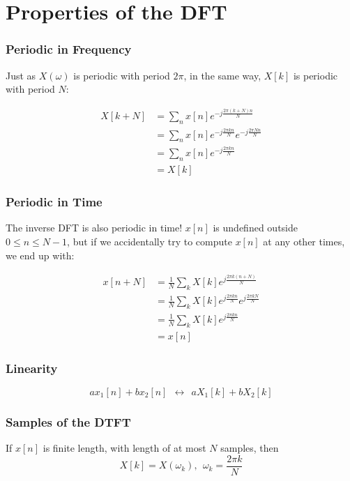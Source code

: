 \documentclass{beamer}
\begin{document}
\section[Properties of DFT]{Properties of the DFT}
\setcounter{subsection}{1}


\begin{frame}
  \frametitle{Periodic in Frequency}

  Just as $X(\omega)$ is periodic with period $2\pi$, in the same way,
  $X[k]$ is periodic with period $N$:

  \begin{align*}
    X[k+N] &= \sum_n x[n]e^{-j\frac{2\pi (k+N)n}{N}}\\
    &= \sum_n x[n]e^{-j\frac{2\pi kn}{N}}e^{-j\frac{2\pi Nn}{N}}\\    
    &= \sum_n x[n]e^{-j\frac{2\pi kn}{N}}\\
    &= X[k]
  \end{align*}
\end{frame}  
        
\begin{frame}
  \frametitle{Periodic in Time}

  The inverse DFT is also periodic in time!  $x[n]$ is undefined
  outside $0\le n\le N-1$, but if we accidentally try to compute
  $x[n]$ at any other times, we end up with:

  \begin{align*}
    x[n+N] &= \frac{1}{N}\sum_k X[k]e^{j\frac{2\pi k(n+N)}{N}}\\
    &= \frac{1}{N}\sum_k X[k]e^{j\frac{2\pi kn}{N}}e^{j\frac{2\pi kN}{N}}\\    
    &= \frac{1}{N}\sum_k X[k]e^{j\frac{2\pi kn}{N}}\\
    &= x[n]
  \end{align*}
\end{frame}  
        
\begin{frame}
  \frametitle{Linearity}

  \begin{displaymath}
    ax_1[n]+bx_2[n] ~~\leftrightarrow~~aX_1[k]+bX_2[k]
  \end{displaymath}
\end{frame}  
        
\begin{frame}
  \frametitle{Samples of the DTFT}

  If $x[n]$ is finite length, with length of at most $N$ samples, then
  \begin{displaymath}
    X[k] = X(\omega_k),~~\omega_k = \frac{2\pi k}{N}
  \end{displaymath}
\end{frame}  
        
\end{document}
